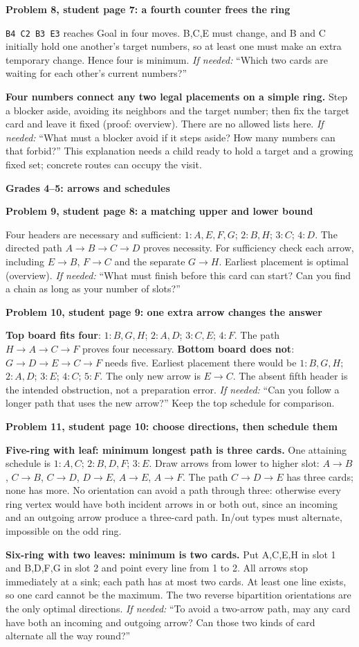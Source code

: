 \documentclass[10pt]{article}
\newcommand{\head}[1]{\par{\large\bfseries #1}\par}
\newcommand{\sub}[1]{\par\textbf{#1}\par}
\newcommand{\hint}[1]{\textit{If needed:} #1}
\newcommand{\word}[1]{\texttt{#1}}
\begin{document}
\sub{Problem 8, student page 7: a fourth counter frees the ring}
\word{B4 C2 B3 E3} reaches Goal in four moves. B,C,E must change, and B and C initially hold one another's target numbers, so at least one must make an extra temporary change. Hence four is minimum. \hint{``Which two cards are waiting for each other's current numbers?''}

\textbf{Four numbers connect any two legal placements on a simple ring.} Step a blocker aside, avoiding its neighbors and the target number; then fix the target card and leave it fixed (proof: overview). There are no allowed lists here. \hint{``What must a blocker avoid if it steps aside? How many numbers can that forbid?''} This explanation needs a child ready to hold a target and a growing fixed set; concrete routes can occupy the visit.
\newpage
\head{Grades 4--5: arrows and schedules}
\sub{Problem 9, student page 8: a matching upper and lower bound}
Four headers are necessary and sufficient: $1:A,E,F,G$; $2:B,H$; $3:C$; $4:D$. The directed path $A\to B\to C\to D$ proves necessity. For sufficiency check each arrow, including $E\to B$, $F\to C$ and the separate $G\to H$. Earliest placement is optimal (overview). \hint{``What must finish before this card can start? Can you find a chain as long as your number of slots?''}

\sub{Problem 10, student page 9: one extra arrow changes the answer}
\textbf{Top board fits four}: $1:B,G,H$; $2:A,D$; $3:C,E$; $4:F$. The path $H\to A\to C\to F$ proves four necessary. \textbf{Bottom board does not}: $G\to D\to E\to C\to F$ needs five. Earliest placement there would be $1:B,G,H$; $2:A,D$; $3:E$; $4:C$; $5:F$. The only new arrow is $E\to C$. The absent fifth header is the intended obstruction, not a preparation error. \hint{``Can you follow a longer path that uses the new arrow?''} Keep the top schedule for comparison.

\sub{Problem 11, student page 10: choose directions, then schedule them}
\textbf{Five-ring with leaf: minimum longest path is three cards.} One attaining schedule is $1:A,C$; $2:B,D,F$; $3:E$. Draw arrows from lower to higher slot: $A\to B$, $C\to B$, $C\to D$, $D\to E$, $A\to E$, $A\to F$. The path $C\to D\to E$ has three cards; none has more. No orientation can avoid a path through three: otherwise every ring vertex would have both incident arrows in or both out, since an incoming and an outgoing arrow produce a three-card path. In/out types must alternate, impossible on the odd ring.

\textbf{Six-ring with two leaves: minimum is two cards.} Put A,C,E,H in slot 1 and B,D,F,G in slot 2 and point every line from 1 to 2. All arrows stop immediately at a sink; each path has at most two cards. At least one line exists, so one card cannot be the maximum. The two reverse bipartition orientations are the only optimal directions. \hint{``To avoid a two-arrow path, may any card have both an incoming and outgoing arrow? Can those two kinds of card alternate all the way round?''}
\end{document}

